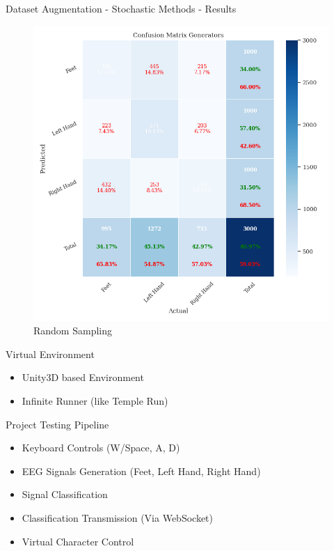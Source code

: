 \begin{frame}{Dataset Augmentation - Stochastic Methods - Results}
\begin{minipage}{0.49\textwidth}
\begin{figure}[htpb!]
            \includegraphics[width=\textwidth]{figures/augmentation/stochastic/confusion_matrix_generators_2024_03_30_18_01_19_random_sampler_using_LSTMNet_0.5943600867678959.pkl.png}
            \caption{Random Sampling}
        \end{figure}
    \end{minipage}
\end{frame}

\begin{frame}{Virtual Environment}
\begin{itemize}
    \item Unity3D based Environment
    \item Infinite Runner (like Temple Run)
\end{itemize}
\end{frame}

\begin{frame}{Project Testing Pipeline}
    \begin{itemize}
        \item Keyboard Controls (W/Space, A, D)
        \item EEG Signals Generation (Feet, Left Hand, Right Hand)
        \item Signal Classification
        \item Classification Transmission (Via WebSocket)
        \item Virtual Character Control
    \end{itemize}
\end{frame}

